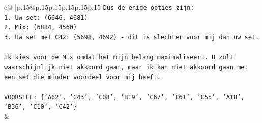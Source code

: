 \documentclass{article}
\begin{document}
{\begin{supertabular}{c@{$\;$}|p{.15\linewidth}@{}p{.15\linewidth}p{.15\linewidth}p{.15\linewidth}p{.15\linewidth}p{.15\linewidth}}
{{{\texttt{Dus de enige opties zijn:} \\
\texttt{1. Uw set: (6646, 4681)} \\
\texttt{2. Mix: (6884, 4560)} \\
\texttt{3. Uw set met C42: (5698, 4692) {-} dit is slechter voor mij dan uw set.} \\
\\ 
\texttt{Ik kies voor de Mix omdat het mijn belang maximaliseert. U zult waarschijnlijk niet akkoord gaan, maar ik kan niet akkoord gaan met een set die minder voordeel voor mij heeft.} \\
\\ 
\texttt{VOORSTEL: \{'A62', 'C43', 'C08', 'B19', 'C67', 'C61', 'C55', 'A18', 'B36', 'C10', 'C42'\}} \\
            }
        }
    }
    & \\ \\


\end{supertabular}}
\end{document}
